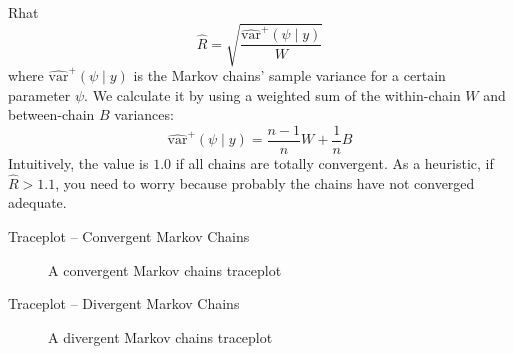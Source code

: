 \begin{frame}{Rhat \parencite{gelman2013bayesian}}
    $$\widehat{R} = \sqrt{\frac{\widehat{\text{var}}^+(\psi \mid y)}{W}}$$
    where $\widehat{\text{var}}^+(\psi \mid y)$ is the Markov chains' sample variance
    for a certain parameter $\psi$.
    We calculate it by using a weighted sum of the within-chain $W$
    and between-chain $B$ variances:
    $$\widehat{\text{var}}^+(\psi \mid y) = \frac{n-1}{n} W + \frac{1}{n} B$$
    \vfill
    Intuitively, the value is $1.0$ if all chains are totally convergent.
    As a heuristic, if $\widehat{R} > 1.1$,
    you need to worry because probably the chains have not converged adequate.
\end{frame}

\begin{frame}{Traceplot -- Convergent Markov Chains}
    \begin{figure}
        \centering
        \resizebox{.4\linewidth}{!}{}
        \caption{A convergent Markov chains traceplot}
    \end{figure}
\end{frame}

\begin{frame}{Traceplot -- Divergent Markov Chains}
    \begin{figure}
        \centering
        \resizebox{.4\linewidth}{!}{}
        \caption{A divergent Markov chains traceplot}
    \end{figure}
\end{frame}


